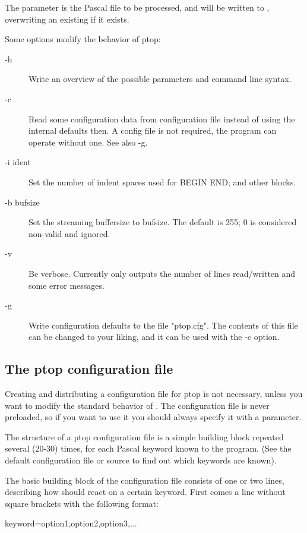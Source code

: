 The  parameter is the Pascal file to be processed, and will be written
to , overwriting an existing  if it exists.

Some options modify the behavior of ptop:

\begin{description}
\item[-h] Write an overview of the possible parameters and command line syntax.
\item[-c ] Read some configuration data from configuration file instead of using
  the internal defaults then. A config file is not required, the program can
  operate without one. See also -g.
\item[-i ident] Set the number of indent spaces used for BEGIN END; and other blocks.
\item[-b bufsize] Set the streaming buffersize to bufsize. The default is 255;
0 is considered non-valid and ignored.
\item[-v] Be verbose. Currently only outputs the number of lines read/written and some error messages.
\item[-g ] Write  configuration defaults to the file
"ptop.cfg". The contents of this file can be changed to your liking, and it
can be used with the -c option.
\end{description}

\subsection{The ptop configuration file}

Creating and distributing a configuration file for ptop is not necessary,
unless you want to modify the standard behavior of . The configuration
file is never preloaded, so if you want to use it you should always specify
it with a  parameter.

The structure of a ptop configuration file is a simple building block repeated
several (20-30) times, for each Pascal keyword known to the  program.
(See the default configuration file or  source to
find out which keywords are known).

The basic building block of the configuration file consists of one or two
lines, describing how  should react on a certain keyword.
First comes a line without square brackets with the following format:

keyword=option1,option2,option3,...

